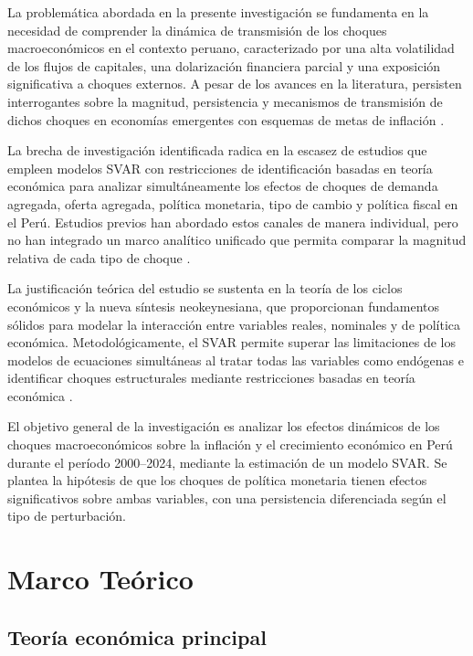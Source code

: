 \documentclass[12pt,a4paper]{article}
\begin{document}
La problemática abordada en la presente investigación se fundamenta en la necesidad de comprender la dinámica de transmisión de los choques macroeconómicos en el contexto peruano, caracterizado por una alta volatilidad de los flujos de capitales, una dolarización financiera parcial y una exposición significativa a choques externos. A pesar de los avances en la literatura, persisten interrogantes sobre la magnitud, persistencia y mecanismos de transmisión de dichos choques en economías emergentes con esquemas de metas de inflación \citep{defrancisco2017, lahura2021, mendoza2022, cespedes2020, humala2023}.

La brecha de investigación identificada radica en la escasez de estudios que empleen modelos SVAR con restricciones de identificación basadas en teoría económica para analizar simultáneamente los efectos de choques de demanda agregada, oferta agregada, política monetaria, tipo de cambio y política fiscal en el Perú. Estudios previos han abordado estos canales de manera individual, pero no han integrado un marco analítico unificado que permita comparar la magnitud relativa de cada tipo de choque \citep{caporale2020, kutner2021, jordà2022, gali2023, fernandez2024}.

La justificación teórica del estudio se sustenta en la teoría de los ciclos económicos y la nueva síntesis neokeynesiana, que proporcionan fundamentos sólidos para modelar la interacción entre variables reales, nominales y de política económica. Metodológicamente, el SVAR permite superar las limitaciones de los modelos de ecuaciones simultáneas al tratar todas las variables como endógenas e identificar choques estructurales mediante restricciones basadas en teoría económica \citep{hamilton1994, lutkepohl2005, enders2014, tsay2014, littlepohl2015}.

El objetivo general de la investigación es analizar los efectos dinámicos de los choques macroeconómicos sobre la inflación y el crecimiento económico en Perú durante el período 2000--2024, mediante la estimación de un modelo SVAR. Se plantea la hipótesis de que los choques de política monetaria tienen efectos significativos sobre ambas variables, con una persistencia diferenciada según el tipo de perturbación.

\section{Marco Teórico}

\subsection{Teoría económica principal}
\end{document}
